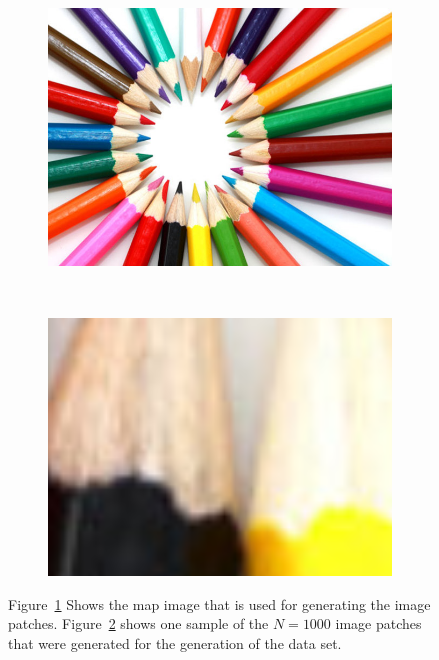 \documentclass{article}
\begin{document}
\begin{figure}
  \centering
  \begin{subfigure}[b]{0.4\textwidth}
    \includegraphics[width=\textwidth]{pencils}
    \label{fig:mapimage}
  \end{subfigure}%
~
  \begin{subfigure}[b]{0.4\textwidth}
    \includegraphics[width=\textwidth]{patches}
    \label{fig:patch}
  \end{subfigure}
  \caption{Figure~\ref{fig:mapimage} Shows the map image that is used
    for generating the image patches. Figure~\ref{fig:patch} shows one
    sample of the $N = 1000$ image patches that were generated for the
  generation of the data set.}
\label{fig:generation}
\end{figure}
\end{document}
